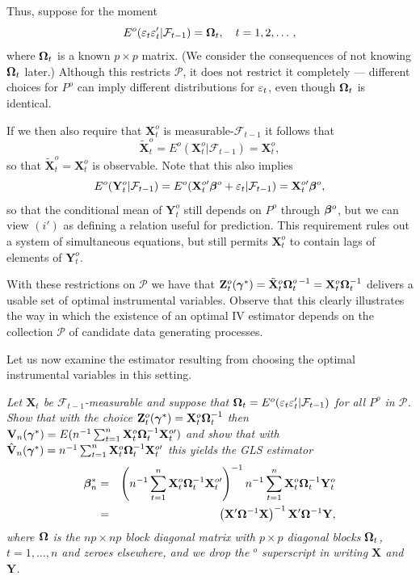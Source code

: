 Thus, suppose for the moment
\[
E^o(\varepsilon_t\varepsilon_t'|\mathcal{F}_{t-1}) = \boldsymbol{\Omega}_t, \quad t = 1, 2, \ldots\,,
\]
where $\boldsymbol{\Omega}_t$ is a known $p \times p$ matrix. (We consider the consequences of not
knowing $\boldsymbol{\Omega}_t$ later.) Although this restricts $\mathcal{P}$, it does not restrict it completely --- different choices for $P^o$ can imply different distributions for $\varepsilon_t$,
even though $\boldsymbol{\Omega}_t$ is identical.

If we then also require that $\mathbf{X}_t^o$ is measurable-$\mathcal{F}_{t-1}$ it follows that
\[
\tilde{\mathbf{X}}_t^o = E^o(\mathbf{X}_t^o|\mathcal{F}_{t-1}) = \mathbf{X}_t^o,
\]
so that $\tilde{\mathbf{X}}_t^o = \mathbf{X}_t^o$ is observable. Note that this also implies
\[
E^o(\mathbf{Y}_t^o|\mathcal{F}_{t-1}) = E^o(\mathbf{X}_t^{o\prime}\boldsymbol{\beta}^o + \varepsilon_t|\mathcal{F}_{t-1}) = \mathbf{X}_t^{o\prime}\boldsymbol{\beta}^o,
\]
so that the conditional mean of $\mathbf{Y}_t^o$ still depends on $P^o$ through $\boldsymbol{\beta}^o$, but we
can view $(i')$ as defining a relation useful for prediction. This requirement
rules out a system of simultaneous equations, but still permits $\mathbf{X}_t^o$ to contain
lags of elements of $\mathbf{Y}_t^o$.

With these restrictions on $\mathcal{P}$ we have that $\mathbf{Z}_t^o(\boldsymbol{\gamma}^*) = \tilde{\mathbf{X}}_t^o\boldsymbol{\Omega}_t^{o\,-1} = \mathbf{X}_t^o\boldsymbol{\Omega}_t^{-1}$
delivers a usable set of optimal instrumental variables. Observe that this
clearly illustrates the way in which the existence of an optimal IV estimator
depends on the collection $\mathcal{P}$ of candidate data generating processes.

Let us now examine the estimator resulting from choosing the optimal
instrumental variables in this setting.

\begin{exercises}
\item\label{ex:4.56} \textit{Let $\mathbf{X}_t$ be $\mathcal{F}_{t-1}$-measurable and suppose that $\boldsymbol{\Omega}_t = E^o(\varepsilon_t\varepsilon_t'|\mathcal{F}_{t-1})$ for all $P^o$ in $\mathcal{P}$. Show that with the choice $\mathbf{Z}_t^o(\boldsymbol{\gamma}^*) = \mathbf{X}_t^o\boldsymbol{\Omega}_t^{-1}$ then $\mathbf{V}_n(\boldsymbol{\gamma}^*) = E(n^{-1}\sum_{t=1}^{n}\mathbf{X}_t^o\boldsymbol{\Omega}_t^{-1}\mathbf{X}_t^{o\prime})$ and show that with $\hat{\mathbf{V}}_n(\boldsymbol{\gamma}^*) = n^{-1}\sum_{t=1}^{n}\mathbf{X}_t^o\boldsymbol{\Omega}_t^{-1}\mathbf{X}_t^{o\prime}$ this yields the GLS estimator}
\begin{eqnarray*}
\boldsymbol{\beta}_n^* &=& \left(n^{-1}\sum_{t=1}^{n}\mathbf{X}_t^o\boldsymbol{\Omega}_t^{-1}\mathbf{X}_t^{o\prime}\right)^{-1}n^{-1}\sum_{t=1}^{n}\mathbf{X}_t^o\boldsymbol{\Omega}_t^{-1}\mathbf{Y}_t^o\\
&=& \left(\mathbf{X}'\boldsymbol{\Omega}^{-1}\mathbf{X}\right)^{-1}\mathbf{X}'\boldsymbol{\Omega}^{-1}\mathbf{Y},
\end{eqnarray*}
\textit{where $\boldsymbol{\Omega}$ is the $np \times np$ block diagonal matrix with $p \times p$ diagonal blocks $\boldsymbol{\Omega}_t$, $t = 1, \ldots, n$ and zeroes elsewhere, and we drop the ${}^o$ superscript in writing $\mathbf{X}$ and $\mathbf{Y}$.}
\end{exercises}

